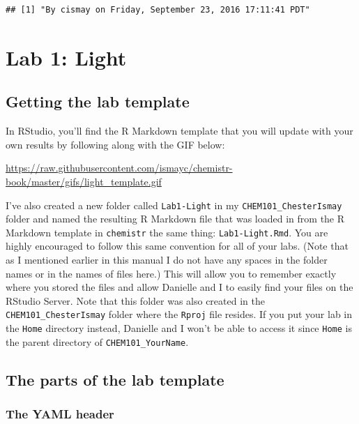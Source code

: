 \documentclass[]{tufte-book}
\begin{document}
\begin{verbatim}
## [1] "By cismay on Friday, September 23, 2016 17:11:41 PDT"
\end{verbatim}

\chapter{Lab 1: Light}\label{light}

\hypertarget{getting-the-lab-template}{\section{Getting the lab
template}\label{getting-the-lab-template}}

In RStudio, you'll find the R Markdown template that you will update
with your own results by following along with the GIF below:

\vspace{0.1in}

\begin{center}\footnotesize{\url{https://raw.githubusercontent.com/ismayc/chemistr-book/master/gifs/light_template.gif}}\end{center}

\vspace{0.1in}

I've also created a new folder called \texttt{Lab1-Light} in my
\texttt{CHEM101\_ChesterIsmay} folder and named the resulting R Markdown
file that was loaded in from the R Markdown template in
\texttt{chemistr} the same thing: \texttt{Lab1-Light.Rmd}. You are
highly encouraged to follow this same convention for all of your labs.
(Note that as I mentioned earlier in this manual I do not have any
spaces in the folder names or in the names of files here.) This will
allow you to remember exactly where you stored the files and allow
Danielle and I to easily find your files on the RStudio Server. Note
that this folder was also created in the \texttt{CHEM101\_ChesterIsmay}
folder where the \texttt{Rproj} file resides. If you put your lab in the
\texttt{Home} directory instead, Danielle and I won't be able to access
it since \texttt{Home} is the parent directory of
\texttt{CHEM101\_YourName}.

\section{The parts of the lab
template}\label{the-parts-of-the-lab-template}

\hypertarget{the-yaml-header}{\subsection{The YAML
header}\label{the-yaml-header}}
\end{document}
